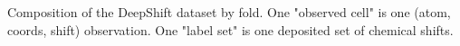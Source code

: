 Composition of the DeepShift dataset by fold. One "observed cell" is one (atom, coords, shift) observation. One "label set" is one deposited set of chemical shifts.
